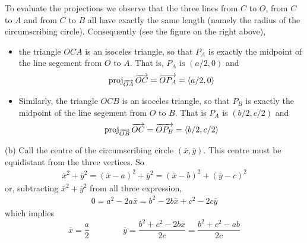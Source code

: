 \begin{solution}
\begin{center}
\end{center}
To evaluate the projections we observe that the three lines from 
$C$ to $O$, from $C$ to $A$ and from $C$ to $B$ all have exactly the same length
(namely the radius of the circumscribing circle). Consequently
(see the figure on the right above),
\begin{itemize}\itemsep1pt \parskip0pt  %
\item 
the triangle $OCA$ is an isoceles triangle, so that $P_A$ is exactly the
midpoint of the line segement from $O$ to $A$. That is, $P_A$ is $(a/2,0)$ and
\begin{equation*}
\text{proj}_{\overrightarrow{\scriptstyle OA}}\,\overrightarrow{OC}
    =\overrightarrow{OP_A}=\left< a/2,0\right>
\end{equation*}
\item 
Similarly, the triangle $OCB$ is an isoceles triangle, so that $P_B$ is 
exactly the midpoint of the line segement from $O$ to $B$. That is $P_A$ is $(b/2,c/2)$ and
\begin{equation*}
\text{proj}_{\overrightarrow{\scriptstyle OB}}\,\overrightarrow{OC}
    =\overrightarrow{OP_B}=\left< b/2,c/2\right>
\end{equation*}
\end{itemize}

(b)
Call the centre of the circumscribing circle $(\bar x,\bar y)$. 
This centre must be equidistant from the three vertices.
So
\begin{align*}
\bar x^2+\bar y^2=(\bar x-a)^2+\bar y^2=(\bar x-b)^2+(\bar y-c)^2 
\end{align*}
or, subtracting $\bar x^2+\bar y^2$ from all three expression,
\begin{align*}
0=a^2-2a\bar x=b^2-2b\bar x+c^2-2c\bar y
\end{align*}
which implies
\begin{equation*}
\bar x=\frac{a}{2}\qquad\qquad \bar y
=\frac{b^2+c^2-2b\bar x}{2c}=\frac{b^2+c^2-ab}{2c}
\end{equation*}



\end{solution}
